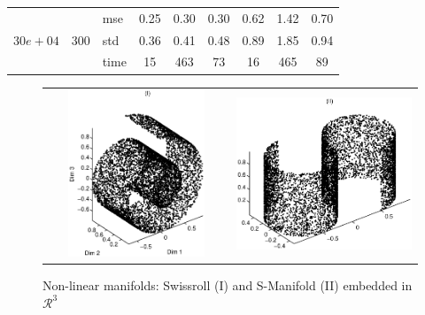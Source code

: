 \documentclass{article} %
\begin{document}
\begin{table}[t]
\begin{center}
\begin{small}
\begin{sc}
\begin{tabular}{lllcccccc}
\\
\multirow{3}{*}{$30e+04$}&\multirow{3}{*}{300}&mse&0.25&0.30&0.30&0.62&1.42&0.70\\
&&std &0.36&0.41&0.48&0.89&1.85&0.94\\
&&time &15&463&73&16&465&89\\

\hline
\end{tabular}
\end{sc}
\end{small}
\end{center}
\vskip -0.1in
\end{table}


\begin{figure}
\centering
\begin{tabular}{cc}
\includegraphics[width=60mm,height=50mm]{Swissroll.eps} & \includegraphics[width=60mm,height=50mm]{SManifold.eps}
\end{tabular}
\caption{Non-linear manifolds: Swissroll (I) and S-Manifold (II) embedded in $\mathcal{R}^3$} \label{manifold:nonlinear}
\end{figure}
\end{document}
